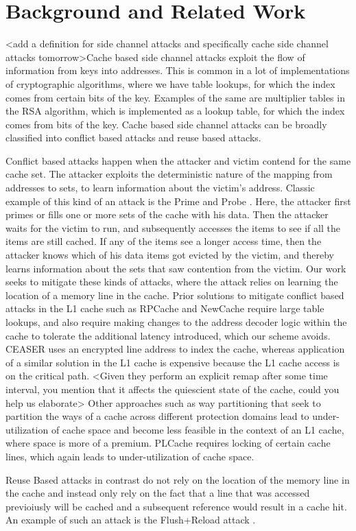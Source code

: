 \section{Background and Related Work}
<add a definition for side channel attacks and specifically cache side channel attacks tomorrow>Cache based side channel attacks exploit the flow of information from keys into addresses. This is common in a lot of implementations of cryptographic algorithms, where we have table lookups, for which the index comes from certain bits of the key. Examples of the same are multiplier tables in the RSA algorithm, which is implemented as a lookup table, for which the index comes from bits of the key. \cite{liu2014random}
Cache based side channel attacks can be broadly classified into conflict based attacks and reuse based attacks.

Conflict based attacks happen when the attacker and victim contend for the same cache set. The attacker exploits the deterministic nature of the mapping from addresses to sets, to learn information about the victim's address. Classic example of this kind of an attack is the Prime and Probe \cite{percival2005cache} \cite{osvik2006cache}. Here, the attacker first primes or fills one or more sets of the cache with his data. Then the attacker waits for the victim to run, and subsequently accesses the items to see if all the items are still cached. If any of the items see a longer access time, then the attacker knows which of his data items got evicted by the victim, and thereby learns information about the sets that saw contention from the victim. Our work seeks to mitigate these kinds of attacks, where the attack relies on learning the location of a memory line in the cache. 
Prior solutions to mitigate conflict based attacks in the L1 cache such as RPCache \cite{wang2007new} and NewCache \cite{wang2008novel} require large table lookups, and also require making changes to the address decoder logic within the cache to tolerate the additional latency introduced, which our scheme avoids. CEASER \cite{qureshi2018ceaser} uses an encrypted line address to index the cache, whereas application of a similar solution in the L1 cache is expensive because the L1 cache access is on the critical path. <Given they perform an explicit remap after some time interval, you mention that it affects the quiescient state of the cache, could you help us elaborate> Other approaches such as way partitioning that seek to partition the ways of a cache across different protection domains \cite{domnitser2012non} \cite{kiriansky2018dawg} lead to under-utilization of cache space and become less feasible in the context of an L1 cache, where space is more of a premium. PLCache \cite{wang2007new} requires locking of certain cache lines, which again leads to under-utilization of cache space.

Reuse Based attacks in contrast do not rely on the location of the memory line in the cache and instead only rely on the fact that a line that was accessed previoiusly will be cached and a subsequent reference would result in a cache hit. An example of such an attack is the Flush+Reload attack \cite{yarom2014flush+}. 
